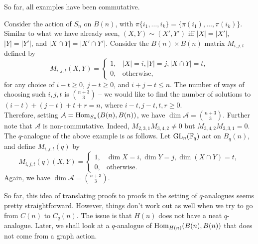 	 So far, all examples have been commutative.

	 \begin{fex}
	 	\label{ex:non-comm-alg}
	 	Consider the action of $S_n$ on $B(n)$, with $\pi \{i_1,\ldots,i_k\} = \{\pi(i_1),\ldots,\pi(i_k)\}$. Similar to what we have already seen, $(X,Y) \sim (X',Y')$ iff $|X| = |X'|$, $|Y| = |Y'|$, and $|X \cap Y| = |X' \cap Y'|$. Consider the $B(n) \times B(n)$ matrix $M_{i,j,t}$ defined by
	 	\[
	 	M_{i,j,t}(X,Y) =
	 	\begin{cases}
	 		1, & |X|=i, |Y|=j, |X \cap Y| = t, \\ 0, & \text{otherwise,}
	 	\end{cases}
	 	\]
	 	for any choice of $i-t\ge 0$, $j-t\ge 0$, and $i+j-t \le n$. The number of ways of choosing such $i,j,t$ is $\binom{n+3}{3}$ -- we would like to find the number of solutions to $(i-t) + (j-t) + t + r = n$, where $i-t,j-t,t,r \ge 0$.\\
	 	Therefore, setting $\mathcal{A} = \operatorname{Hom}_{S_n}(B(n),B(n))$, we have $\dim \mathcal{A} = \binom{n+3}{3}$. Further note that $\mathcal{A}$ is non-commutative. Indeed, $M_{2,3,1} M_{3,4,2} \ne 0$ but $M_{3,4,2} M_{2,3,1} = 0$.\\

	 	The $q$-analogue of the above example is as follows. Let $\operatorname{GL}_n(\mathbb{F}_q)$ act on $B_q(n)$, and define $M_{i,j,t}(q)$ by
	 	\[ M_{i,j,t}(q)(X,Y) = \begin{cases} 1, & \dim X = i, \dim Y = j, \dim (X \cap Y) = t, \\ 0, & \text{otherwise.} \end{cases} \]
	 	Again, we have $\dim \mathcal{A} = \binom{n+3}{3}$.
	 \end{fex}

	So far, this idea of translating proofs to proofs in the setting of $q$-analogues seems pretty straightforward. However, things don't work out as well when we try to go from $C(n)$ to $C_q(n)$. The issue is that $H(n)$ does not have a neat $q$-analogue. Later, we shall look at a $q$-analogue of $\operatorname{Hom}_{H(n)}(B(n),B(n))$ that does not come from a graph action.

